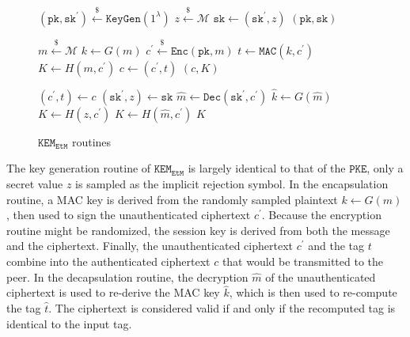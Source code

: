 \documentclass[floatrow,journal=tches,submission]{iacrtrans}
\newcommand{\pke}{\texttt{PKE}}
\newcommand{\keygen}{\texttt{KeyGen}}
\newcommand{\encrypt}{\texttt{Enc}}
\newcommand{\decrypt}{\texttt{Dec}}
\newcommand{\kem}{\texttt{KEM}}
\newcommand{\encap}{\texttt{Encap}}
\newcommand{\decap}{\texttt{Decap}}
\newcommand{\etm}{\texttt{EtM}}  %
\newcommand{\mac}{\texttt{MAC}}
\newcommand{\pk}{\texttt{pk}}
\newcommand{\sk}{\texttt{sk}}
\newcommand{\leftsample}{\stackrel{\$}{\leftarrow}}
\begin{document}
\begin{figure}[H]
    \center
    \begin{algorithm}[H]
        \caption{$\keygen_\etm$}\label{alg:etm-keygen}
        \begin{algorithmic}[1]
            \State $(\pk, \sk^\prime) \leftsample \keygen(1^\lambda)$
            \State $z \leftsample \mathcal{M}$
            \State $\sk \leftarrow (\sk^\prime, z)$
            \State \Return $(\pk, \sk)$
        \end{algorithmic}
    \end{algorithm}
    \begin{algorithm}[H]
        \caption{$\encap(\pk)$}\label{alg:etm-encap}
        \begin{algorithmic}[1]
            \State $m \leftsample \mathcal{M}$
            \State $k \leftarrow G(m)$
            \State $c^\prime \leftsample \encrypt(\pk, m)$
            \State $t \leftarrow \mac(k, c^\prime)$
            \State $K \leftarrow H(m, c^\prime)$
            \State $c \leftarrow (c^\prime, t)$
            \State \Return $(c, K)$
        \end{algorithmic}
    \end{algorithm}
    \begin{algorithm}[H]
        \caption{$\decap(\sk, c)$}\label{alg:etm-decap}
        \begin{algorithmic}[1]
            \State $(c^\prime, t) \leftarrow c$
            \State $(\sk^\prime, z) \leftarrow \sk$
            \State $\hat{m} \leftarrow \decrypt(\sk^\prime, c^\prime)$
            \State $\hat{k} \leftarrow G(\hat{m})$
            \If{$\mac(\hat{k}, c^\prime) \neq t$}
                \State $K \leftarrow H(z, c^\prime)$
            \Else
                \State $K \leftarrow H(\hat{m}, c^\prime)$
            \EndIf
            \State \Return $K$
        \end{algorithmic}
    \end{algorithm}
    \caption{$\kem_\etm$ routines}\label{fig:etm-routines} 
\end{figure}

The key generation routine of $\kem_\etm$ is largely identical to that of the $\pke$, only a secret value $z$ is sampled as the implicit rejection symbol. In the encapsulation routine, a MAC key is derived from the randomly sampled plaintext $k \leftarrow G(m)$, then used to sign the unauthenticated ciphertext $c^\prime$. Because the encryption routine might be randomized, the session key is derived from both the message and the ciphertext. Finally, the unauthenticated ciphertext $c^\prime$ and the tag $t$ combine into the authenticated ciphertext $c$ that would be transmitted to the peer. In the decapsulation routine, the decryption $\hat{m}$ of the unauthenticated ciphertext is used to re-derive the MAC key $\hat{k}$, which is then used to re-compute the tag $\hat{t}$. The ciphertext is considered valid if and only if the recomputed tag is identical to the input tag.
\end{document}
